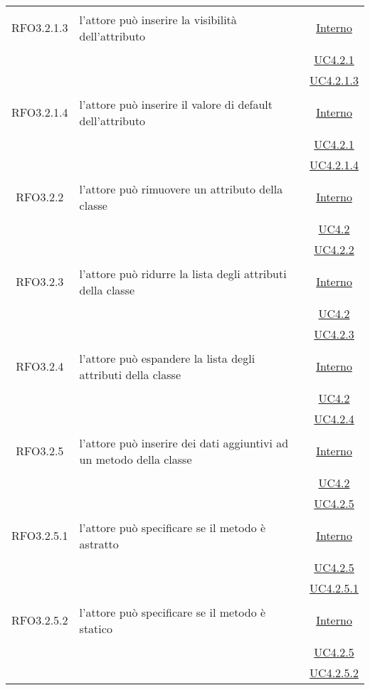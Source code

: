 \begin{longtable}{|c|>{\centering}m{7cm}|c|}
\hypertarget{RFO3.2.1.3}{RFO3.2.1.3} & l'attore può inserire la visibilità dell'attributo & \hyperlink{Interno}{Interno}\\
& &\hyperref[UC4.2.1]{UC4.2.1}\\
& &\hyperref[UC4.2.1.3]{UC4.2.1.3}\\ \hline

\hypertarget{RFO3.2.1.4}{RFO3.2.1.4} & l'attore può inserire il valore di default dell'attributo & \hyperlink{Interno}{Interno}\\
& &\hyperref[UC4.2.1]{UC4.2.1}\\
& &\hyperref[UC4.2.1.4]{UC4.2.1.4}\\ \hline

\hypertarget{RFO3.2.2}{RFO3.2.2} & l'attore può rimuovere un attributo della classe & \hyperlink{Interno}{Interno}\\
& &\hyperref[UC4.2]{UC4.2}\\
& &\hyperref[UC4.2.2]{UC4.2.2}\\ \hline

\hypertarget{RFO3.2.3}{RFO3.2.3} & l'attore può ridurre la lista degli attributi della classe & \hyperlink{Interno}{Interno}\\
& &\hyperref[UC4.2]{UC4.2}\\
& &\hyperref[UC4.2.3]{UC4.2.3}\\ \hline

\hypertarget{RFO3.2.4}{RFO3.2.4} & l'attore può espandere la lista degli attributi della classe & \hyperlink{Interno}{Interno}\\
& &\hyperref[UC4.2]{UC4.2}\\
& &\hyperref[UC4.2.4]{UC4.2.4}\\ \hline

\hypertarget{RFO3.2.5}{RFO3.2.5} & l'attore può inserire dei dati aggiuntivi ad un metodo della classe & \hyperlink{Interno}{Interno}\\
& &\hyperref[UC4.2]{UC4.2}\\
& &\hyperref[UC4.2.5]{UC4.2.5}\\ \hline

\hypertarget{RFO3.2.5.1}{RFO3.2.5.1} & l'attore può specificare se il metodo è astratto & \hyperlink{Interno}{Interno}\\
& &\hyperref[UC4.2.5]{UC4.2.5}\\
& &\hyperref[UC4.2.5.1]{UC4.2.5.1}\\ \hline

\hypertarget{RFO3.2.5.2}{RFO3.2.5.2} & l'attore può specificare se il metodo è statico & \hyperlink{Interno}{Interno}\\
& &\hyperref[UC4.2.5]{UC4.2.5}\\
& &\hyperref[UC4.2.5.2]{UC4.2.5.2}\\ \hline


\end{longtable}

